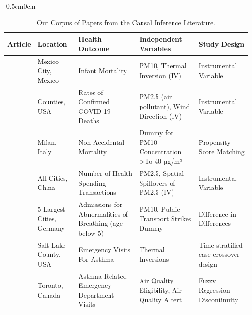 \begin{table}[]
\thispagestyle{empty}
\caption{Our Corpus of Papers from the Causal Inference Literature.}
\begin{adjustwidth}{-0.5cm}{0cm}
\centering
\scriptsize
\begin{threeparttable}
\label{tab:lit_review}
\begin{tabular}{p{2.5cm}p{3cm}p{7cm}p{7cm}p{4cm}}
\toprule
\textbf{Article}      & \textbf{Location}           & \textbf{Health Outcome}                                     & \textbf{Independent Variables}                                                     & \textbf{Study Design}                             \\ \midrule
\rowcolor{Gray}
\cite{arceo_does_2016}    & Mexico City, Mexico         & Infant Mortality                                            & PM10, Thermal Inversion (IV)                                       & Instrumental Variable                             \\
\cite{austin2020covid}          & Counties, USA               & Rates of Confirmed COVID-19 Deaths                          & PM2.5 (air pollutant), Wind Direction (IV)                                         & Instrumental Variable                             \\
\rowcolor{Gray}
\cite{baccini_assessing_2017}         & Milan, Italy                & Non-Accidental Mortality                                    & Dummy for PM10 Concentration \textgreater To 40 µg/m³                              & Propensity Score Matching                         \\
\cite{barwick_morbidity_2018}         & All Cities, China           & Number of Health Spending Transactions                      & PM2.5, Spatial Spillovers of PM2.5 (IV)                            & Instrumental Variable                             \\
\rowcolor{Gray}
\cite{bauernschuster_when_2017}  & 5 Largest Cities, Germany   & Admissions for Abnormalities of Breathing (age below 5)     & PM10, Public Transport Strikes Dummy                               & Difference in Differences                         \\
\cite{beard_winter_2012}          & Salt Lake County, USA       & Emergency Visits For Asthma                                 & Thermal Inversions                                                                 & Time-stratified case-crossover design             \\
\rowcolor{Gray}
\cite{chen_effect_2018}           & Toronto, Canada             & Asthma-Related Emergency Department Visits                  & Air Quality Eligibility, Air Quality Altert                                        & Fuzzy Regression Discontinuity                    \\

\end{tabular}
\end{threeparttable}
\end{adjustwidth}
\end{table}
